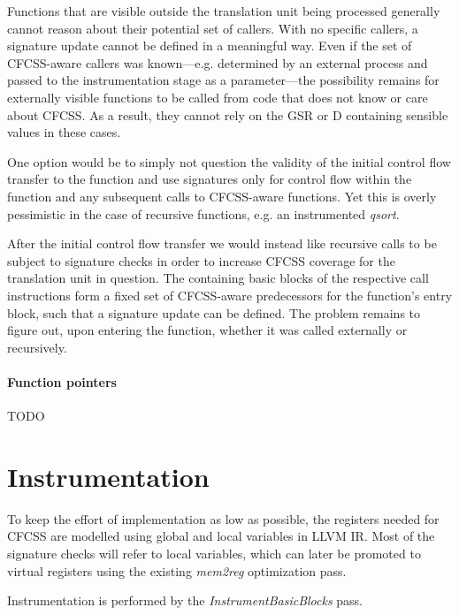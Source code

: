 Functions that are visible outside the translation unit being processed
generally cannot reason about their potential set of callers. With no specific
callers, a signature update cannot be defined in a meaningful way. Even if the
set of CFCSS-aware callers was known—e.g. determined by an external
process and passed to the instrumentation stage as a parameter—the possibility
remains for externally visible functions to be called from code that does not
know or care about CFCSS. As a result, they cannot rely on the GSR or
D containing sensible values in these cases.

One option would be to simply not question the validity of the initial control
flow transfer to the function and use signatures only for control flow within
the function and any subsequent calls to CFCSS-aware functions. Yet this is
overly pessimistic in the case of recursive functions, e.g. an instrumented
\emph{qsort}.

After the initial control flow transfer we would instead like recursive calls
to be subject to signature checks in order to increase CFCSS coverage for the
translation unit in question. The containing basic blocks of the respective
call instructions form a fixed set of CFCSS-aware predecessors for the
function's entry block, such that a signature update can be defined. The
problem remains to figure out, upon entering the function, whether it was
called externally or recursively.


\paragraph{Function pointers} TODO


\section{Instrumentation}

To keep the effort of implementation as low as possible, the registers needed
for CFCSS are modelled using global and local variables in LLVM IR. Most of the
signature checks will refer to local variables, which can later be promoted to
virtual registers using the existing \emph{mem2reg} \cite{llvm-passes}
optimization pass.

Instrumentation is performed by the \emph{InstrumentBasicBlocks} pass.

